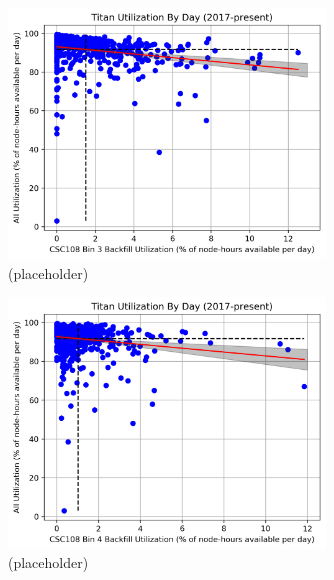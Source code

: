 \begin{figure}
  \includegraphics[width=0.75\textwidth]{images/linfit-utilization-by-true-day-bin3.png}
\caption{(placeholder)}
\label{fig:utilization-bin3}
\end{figure}


\begin{figure}
  \includegraphics[width=0.75\textwidth]{images/linfit-utilization-by-true-day-bin4.png}
\caption{(placeholder)}
\label{fig:utilization-bin4}
\end{figure}


